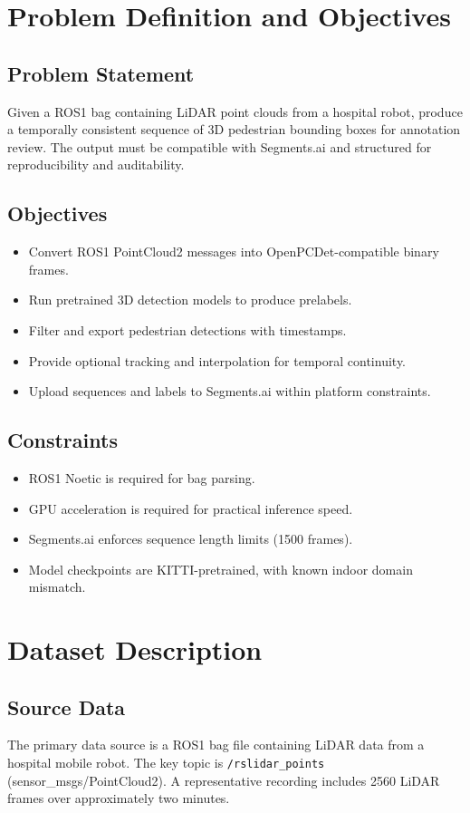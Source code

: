 \documentclass[a4paper,12pt]{report}
\begin{document}
\chapter{Problem Definition and Objectives}
\section{Problem Statement}
Given a ROS1 bag containing LiDAR point clouds from a hospital robot, produce a temporally consistent sequence of 3D pedestrian bounding boxes for annotation review. The output must be compatible with Segments.ai and structured for reproducibility and auditability.

\section{Objectives}
\begin{itemize}
\item Convert ROS1 PointCloud2 messages into OpenPCDet-compatible binary frames.
\item Run pretrained 3D detection models to produce prelabels.
\item Filter and export pedestrian detections with timestamps.
\item Provide optional tracking and interpolation for temporal continuity.
\item Upload sequences and labels to Segments.ai within platform constraints.
\end{itemize}

\section{Constraints}
\begin{itemize}
\item ROS1 Noetic is required for bag parsing.
\item GPU acceleration is required for practical inference speed.
\item Segments.ai enforces sequence length limits (1500 frames).
\item Model checkpoints are KITTI-pretrained, with known indoor domain mismatch.
\end{itemize}

\chapter{Dataset Description}
\section{Source Data}
The primary data source is a ROS1 bag file containing LiDAR data from a hospital mobile robot. The key topic is \texttt{/rslidar\_points} (sensor\_msgs/PointCloud2). A representative recording includes 2560 LiDAR frames over approximately two minutes.
\end{document}
